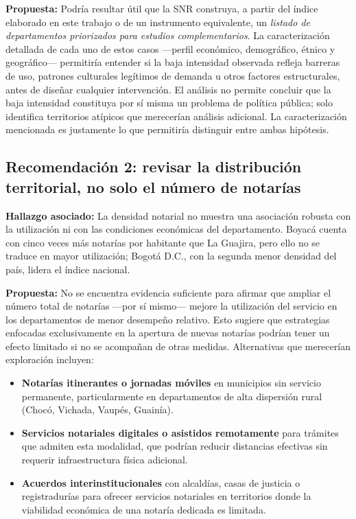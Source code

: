 \documentclass{article}
\begin{document}
\textbf{Propuesta:} Podría resultar útil que la SNR construya, a
partir del índice elaborado en este trabajo o de un instrumento
equivalente, un \emph{listado de departamentos priorizados para
estudios complementarios}. La caracterización detallada de cada uno
de estos casos ---perfil económico, demográfico, étnico y
geográfico--- permitiría entender si la baja intensidad observada
refleja barreras de uso, patrones culturales legítimos de demanda
u otros factores estructurales, antes de diseñar cualquier
intervención. El análisis no permite concluir que la baja intensidad
constituya por sí misma un problema de política pública; solo
identifica territorios atípicos que merecerían análisis adicional. La caracterización
mencionada es justamente lo que permitiría distinguir entre ambas
hipótesis.

\subsection{Recomendación 2: revisar la distribución territorial, no solo el número de notarías}

\textbf{Hallazgo asociado:} La densidad notarial no muestra una
asociación robusta con la utilización ni con las condiciones
económicas del departamento. Boyacá cuenta con cinco veces más
notarías por habitante que La Guajira, pero ello no se traduce en
mayor utilización; Bogotá D.C., con la segunda menor densidad del
país, lidera el índice nacional.

\textbf{Propuesta:} No se encuentra evidencia suficiente para afirmar que ampliar el número total de notarías ---por sí mismo--- mejore la utilización del servicio en los departamentos de menor desempeño relativo.
Esto sugiere que estrategias enfocadas exclusivamente en la apertura
de nuevas notarías podrían tener un efecto limitado si no se acompañan
de otras medidas. Alternativas que merecerían exploración incluyen:

\begin{itemize}
    \item \textbf{Notarías itinerantes o jornadas móviles} en
    municipios sin servicio permanente, particularmente en
    departamentos de alta dispersión rural (Chocó, Vichada, Vaupés,
    Guainía).
    \item \textbf{Servicios notariales digitales o asistidos
    remotamente} para trámites que admiten esta modalidad, que
    podrían reducir distancias efectivas sin requerir infraestructura
    física adicional.
    \item \textbf{Acuerdos interinstitucionales} con alcaldías,
    casas de justicia o registradurías para ofrecer servicios
    notariales en territorios donde la viabilidad económica de una
    notaría dedicada es limitada.
\end{itemize}
\end{document}
